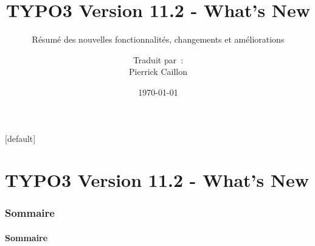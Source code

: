 \documentclass[t]{beamer}
\title{TYPO3 Version 11.2 - What's New}
\subtitle{Résumé des nouvelles fonctionnalités, changements et améliorations}
\author{
	\centerline{Traduit par~:}
	\centerline{Pierrick Caillon}
}
\date{\today}
\begin{document}
\sharefont


\begingroup
	[default]
	\begin{frame}
		\titlepage
	\end{frame}
\endgroup


\section*{TYPO3 Version 11.2 - What's New}
\begin{frame}[fragile]
	\frametitle{Sommaire}
	\framesubtitle{Sommaire}

	\tableofcontents

\end{frame}















\end{document}
